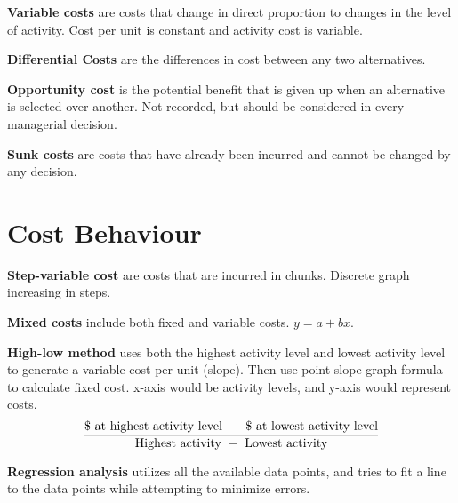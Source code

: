 \documentclass[english, 12pt]{article}
\begin{document}
\begin{defn}
\textbf{Variable costs} are costs that change in direct proportion to changes in the level of activity. Cost per unit is constant and activity cost is variable.
\end{defn}

\begin{defn}
\textbf{Differential Costs} are the differences in cost between any two alternatives.
\end{defn}

\begin{defn}
\textbf{Opportunity cost} is the potential benefit that is given up when an alternative is selected over another. Not recorded, but should be considered in every managerial decision.
\end{defn}

\begin{defn}
\textbf{Sunk costs} are costs that have already been incurred and cannot be changed by any decision.
\end{defn}

\section{Cost Behaviour}

\begin{defn}
\textbf{Step-variable cost} are costs that are incurred in chunks. Discrete graph increasing in steps.
\end{defn}

\begin{defn}
\textbf{Mixed costs} include both fixed and variable costs. $y = a + bx$.
\end{defn}

\begin{defn}
\textbf{High-low method} uses both the highest activity level and lowest activity level to generate a variable cost per unit (slope). Then use point-slope graph formula to calculate fixed cost. x-axis would be activity levels, and y-axis would represent costs.
\[\frac{\text{\$ at highest activity level } - \text{ \$ at lowest activity level}}{\text{Highest activity }-\text{ Lowest activity}}\]
\end{defn}

\begin{defn}
\textbf{Regression analysis} utilizes all the available data points, and tries to fit a line to the data points while attempting to minimize errors.
\end{defn}
\end{document}
